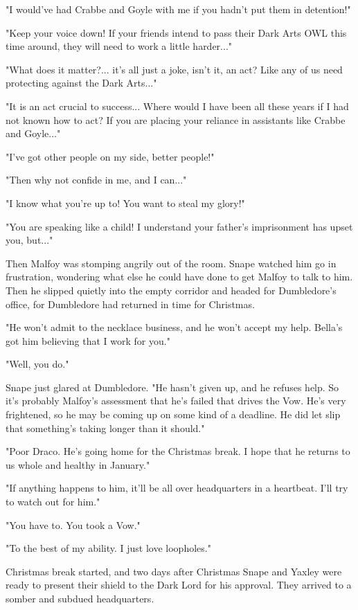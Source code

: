 \documentclass[a4paper,11pt]{article}
\begin{document}
"I would've had Crabbe and Goyle with me if you hadn't put them in detention!"

"Keep your voice down! If your friends intend to pass their Dark Arts OWL this time around, they will need to work a little harder..."

"What does it matter?... it's all just a joke, isn't it, an act? Like any of us need protecting against the Dark Arts..."

"It is an act crucial to success... Where would I have been all these years if I had not known how to act? If you are placing your reliance in assistants like Crabbe and Goyle..."

"I've got other people on my side, better people!"

"Then why not confide in me, and I can..."

"I know what you're up to! You want to steal my glory!"

"You are speaking like a child! I understand your father's imprisonment has upset you, but..."

Then Malfoy was stomping angrily out of the room. Snape watched him go in frustration, wondering what else he could have done to get Malfoy to talk to him. Then he slipped quietly into the empty corridor and headed for Dumbledore's office, for Dumbledore had returned in time for Christmas.

"He won't admit to the necklace business, and he won't accept my help. Bella's got him believing that I work for you."

"Well, you do."

Snape just glared at Dumbledore. "He hasn't given up, and he refuses help. So it's probably Malfoy's assessment that he's failed that drives the Vow. He's very frightened, so he may be coming up on some kind of a deadline. He did let slip that something's taking longer than it should."

"Poor Draco. He's going home for the Christmas break. I hope that he returns to us whole and healthy in January."

"If anything happens to him, it'll be all over headquarters in a heartbeat. I'll try to watch out for him."

"You have to. You took a Vow."

"To the best of my ability. I just love loopholes."

Christmas break started, and two days after Christmas Snape and Yaxley were ready to present their shield to the Dark Lord for his approval. They arrived to a somber and subdued headquarters.
\end{document}
